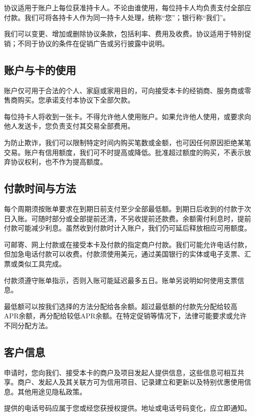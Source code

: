 \documentclass[UTF8,fontset=none,11pt,a4paper]{ctexart}
\begin{document}
协议适用于账户上每位获准持卡人。不论由谁使用，每位持卡人均负责支付全部应付款。我们可将各持卡人作为同一持卡人处理，统称“您”；银行称“我们”。


我们可以变更、增加或删除协议条款，包括利率、费用及收费。协议适用于特别促销；不同于协议的条件在促销广告或另行披\allowbreak\mbox{露中说明。}


\subsection*{账户与卡的使用}
账户仅可用于合法的个人、家庭或家用目的，可向接受本卡的经销商、服务商或零售商购买。您承诺支付本协议下\allowbreak\mbox{全部欠款。}


每位持卡人将收到一张卡。不得允许他人使用账户。如果允许他人使用，或要求向他人发送卡，您负责支付其交易\allowbreak\mbox{全部费用。}


为防止欺诈，我们可以限制特定时间内购买笔数或金额，也可因任何原因拒绝某笔交易。账户有信用额度，我们可不时提高或降低。批准超过额度的购买，不表示放弃协议权利，也不作为\allowbreak\mbox{提高额度。}


\subsection*{付款时间与方法}
每个周期须按账单要求在到期日前支付至少全部最低额。到期日后收到的付款于次日入账。可随时部分或全部提前还清，不另收提前还款费。余额需付利息时，提前付款可能减少利息。虽然收到付款时计入账户，我们仍可延后释放相应\allowbreak\mbox{可用额度。}


可邮寄、网上付款或在接受本卡及付款的指定商户付款。我们可能允许电话付款，但加急电话付款可以收费。付款须使用美元，通过美国银行的实体或电子支票、汇票或类似\allowbreak\mbox{工具完成。}


付款须遵守账单指示，否则入账可能延迟最多五日。账单另说明如何使用\allowbreak\mbox{支票信息。}


最低额可以按我们选择的方法分配给各余额。超过最低额的付款先分配给较高APR余额，再分配给较低APR余额。在特定促销等情况下，法律可能要求或允许不同\allowbreak\mbox{分配方法。}


\subsection*{客户信息}
申请时，您向我们、接受本卡的商户及项目发起人提供信息，这些信息可相互共享。商户、发起人及其关联方可为信用项目、记录建立和更新以及特别优惠使用信息。其他用途见\allowbreak\mbox{隐私政策。}


提供的电话号码应属于您或经您获授权提供。地址或电话号码变化，应\allowbreak\mbox{立即通知。}
\end{document}
